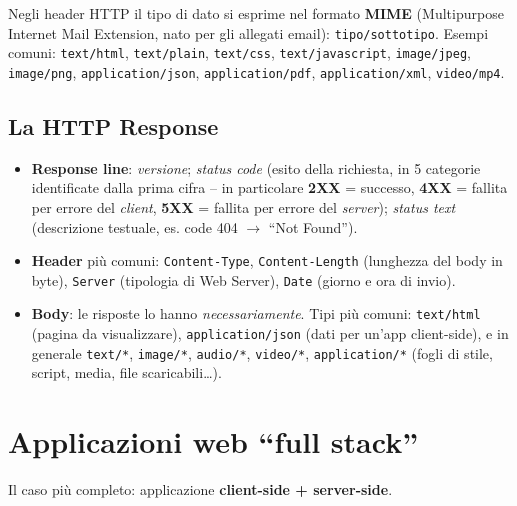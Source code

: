 \begin{definizione}
Negli header HTTP il tipo di dato si esprime nel formato \textbf{MIME}
(Multipurpose Internet Mail Extension, nato per gli allegati email): \texttt{tipo/sottotipo}.
Esempi comuni: \texttt{text/html}, \texttt{text/plain}, \texttt{text/css},
\texttt{text/javascript}, \texttt{image/jpeg}, \texttt{image/png},
\texttt{application/json}, \texttt{application/pdf}, \texttt{application/xml},
\texttt{video/mp4}.
\end{definizione}

\subsection{La HTTP Response}
\begin{itemize}
  \item \textbf{Response line}: \emph{versione}; \emph{status code} (esito della richiesta,
        in 5 categorie identificate dalla prima cifra -- in particolare
        \textbf{2XX} = successo, \textbf{4XX} = fallita per errore del \emph{client},
        \textbf{5XX} = fallita per errore del \emph{server}); \emph{status text}
        (descrizione testuale, es. code 404 $\rightarrow$ ``Not Found'').
  \item \textbf{Header} pi\`u comuni: \texttt{Content-Type}, \texttt{Content-Length}
        (lunghezza del body in byte), \texttt{Server} (tipologia di Web Server),
        \texttt{Date} (giorno e ora di invio).
  \item \textbf{Body}: le risposte lo hanno \emph{necessariamente}. Tipi pi\`u comuni:
        \texttt{text/html} (pagina da visualizzare), \texttt{application/json} (dati per
        un'app client-side), e in generale \texttt{text/*}, \texttt{image/*},
        \texttt{audio/*}, \texttt{video/*}, \texttt{application/*} (fogli di stile, script,
        media, file scaricabili\dots).
\end{itemize}

\section{Applicazioni web ``full stack''}

Il caso pi\`u completo: applicazione \textbf{client-side + server-side}.

